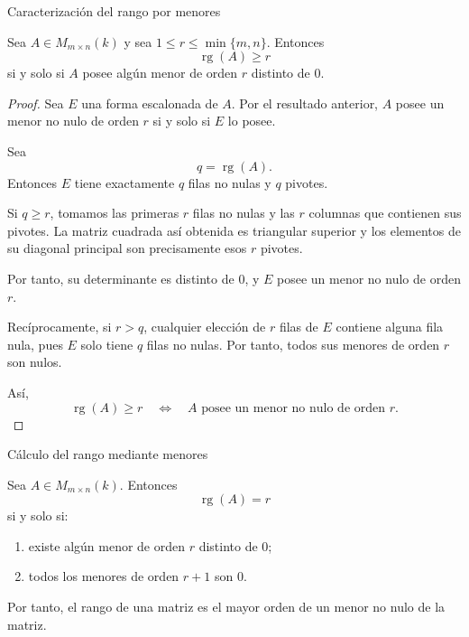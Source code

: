 \begin{frame}[allowframebreaks]{Caracterización del rango por menores}

\begin{theorem}
Sea \(A\in M_{m\times n}(k)\) y sea
\(1\leq r\leq\min\{m,n\}\). Entonces
\[
\operatorname{rg}(A)\geq r
\]
si y solo si \(A\) posee algún menor de orden \(r\) distinto de \(0\).
\end{theorem}

\begin{proof}
Sea \(E\) una forma escalonada de \(A\). Por el resultado anterior,
\(A\) posee un menor no nulo de orden \(r\) si y solo si \(E\) lo
posee.

Sea
\[
q=\operatorname{rg}(A).
\]
Entonces \(E\) tiene exactamente \(q\) filas no nulas y \(q\)
pivotes.

Si \(q\geq r\), tomamos las primeras \(r\) filas no nulas y las
\(r\) columnas que contienen sus pivotes. La matriz cuadrada así
obtenida es triangular superior y los elementos de su diagonal
principal son precisamente esos \(r\) pivotes.

Por tanto, su determinante es distinto de \(0\), y \(E\) posee un
menor no nulo de orden \(r\).

Recíprocamente, si \(r>q\), cualquier elección de \(r\) filas de
\(E\) contiene alguna fila nula, pues \(E\) solo tiene \(q\) filas
no nulas. Por tanto, todos sus menores de orden \(r\) son nulos.

Así,
\[
\operatorname{rg}(A)\geq r
\quad\Longleftrightarrow\quad
A\text{ posee un menor no nulo de orden }r.
\]
\end{proof}

\end{frame}

\begin{frame}{Cálculo del rango mediante menores}

\begin{corollary}
Sea \(A\in M_{m\times n}(k)\). Entonces
\[
\operatorname{rg}(A)=r
\]
si y solo si:
\begin{enumerate}
\item existe algún menor de orden \(r\) distinto de \(0\);
\item todos los menores de orden \(r+1\) son \(0\).
\end{enumerate}
\end{corollary}

\medskip

Por tanto, el rango de una matriz es el \alert{mayor orden de un
menor no nulo} de la matriz.

\end{frame}



